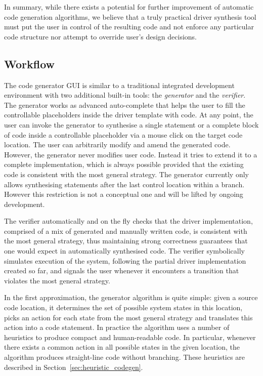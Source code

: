 In summary, while there exists a potential for further improvement of automatic code generation algorithms, we believe that a truly practical driver synthesis tool must put the user in control of the resulting code and not enforce any particular code structure nor attempt to override user's design decisions.

\subsection{Workflow}

The \termite code generator GUI is similar to a traditional integrated development environment with two additional built-in tools: the \emph{generator} and the \emph{verifier}.  The generator works as advanced auto-complete that helps the user to fill the controllable placeholders inside the driver template with code.  At any point, the user can invoke the generator to synthesise a single statement or a complete block of code inside a controllable placeholder via a mouse click on the target code location.  The user can arbitrarily modify and amend the generated code.  However, the generator never modifies user code.  Instead it tries to extend it to a complete implementation, which is always possible provided that the existing code is consistent with the most general strategy.  The generator currently only allows synthesising statements after the last control location within a branch.  However this restriction is not a conceptual one and will be lifted by ongoing development.

The verifier automatically and on the fly checks that the driver implementation, comprised of a mix of generated and manually written code, is consistent with the most general strategy, thus maintaining strong correctness guarantees that one would expect in automatically synthesised code.  The verifier symbolically simulates execution of the system, following the partial driver implementation created so far, and signals the user whenever it encounters a transition that violates the most general strategy.

In the first approximation, the generator algorithm is quite simple: given a source code location, it determines the set of possible system states in this location, picks an action for each state from the most general strategy and translates this action into a code statement.  In practice the algorithm uses a number of heuristics to produce compact and human-readable code.  In particular, whenever there exists a common action in all possible states in the given location, the algorithm produces straight-line code without branching. These heuristics are described in Section~\ref{sec:heuristic_codegen}.

